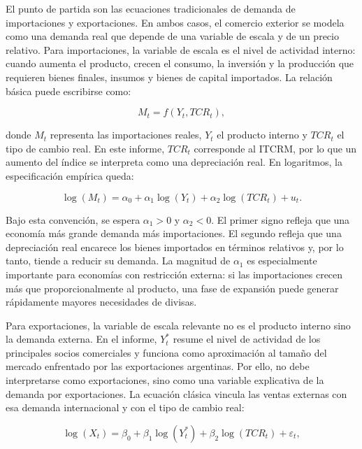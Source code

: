 \documentclass[11pt,a4paper]{article}
\begin{document}
	El punto de partida son las ecuaciones tradicionales de demanda de
	importaciones y exportaciones. En ambos casos, el comercio exterior se modela
	como una demanda real que depende de una variable de escala y de un precio
	relativo. Para importaciones, la variable de escala es el nivel de actividad
	interno: cuando aumenta el producto, crecen el consumo, la inversión y la
	producción que requieren bienes finales, insumos y bienes de capital
	importados. La relación básica puede escribirse como:

	\begin{equation}
		M_t = f(Y_t, TCR_t),
	\end{equation}

	donde $M_t$ representa las importaciones reales, $Y_t$ el producto interno y
	$TCR_t$ el tipo de cambio real. En este informe, $TCR_t$ corresponde al ITCRM,
	por lo que un aumento del índice se interpreta como una depreciación real. En
	logaritmos, la especificación empírica queda:

	\begin{equation}
		\log(M_t) = \alpha_0 + \alpha_1 \log(Y_t) +
		\alpha_2 \log(TCR_t) + u_t.
		\label{eq:importaciones-largo-plazo}
	\end{equation}

	Bajo esta convención, se espera $\alpha_1>0$ y $\alpha_2<0$. El primer signo
	refleja que una economía más grande demanda más importaciones. El segundo
	refleja que una depreciación real encarece los bienes importados en términos
	relativos y, por lo tanto, tiende a reducir su demanda. La magnitud de
	$\alpha_1$ es especialmente importante para economías con restricción externa:
	si las importaciones crecen más que proporcionalmente al producto, una fase de
	expansión puede generar rápidamente mayores necesidades de divisas.

	Para exportaciones, la variable de escala relevante no es el producto interno
	sino la demanda externa. En el informe, $Y_t^*$ resume el nivel de actividad de
	los principales socios comerciales y funciona como aproximación al tamaño del
	mercado enfrentado por las exportaciones argentinas. Por ello, no debe
	interpretarse como exportaciones, sino como una variable explicativa de la
	demanda por exportaciones. La ecuación clásica vincula las ventas externas con
	esa demanda internacional y con el tipo de cambio real:

	\begin{equation}
		\log(X_t) = \beta_0 + \beta_1 \log(Y_t^*) +
		\beta_2 \log(TCR_t) + \varepsilon_t,
		\label{eq:exportaciones-largo-plazo}
	\end{equation}
\end{document}
